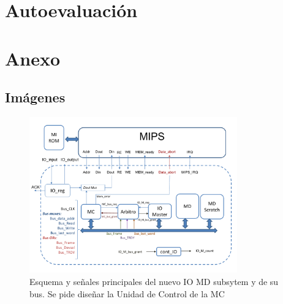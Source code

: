 \documentclass{article}
\begin{document}
\section{Autoevaluación}
\lipsum[15-18]

\newpage
\section{Anexo}
\subsection{Imágenes}
\begin{figure}[htbp]
  \centering
  \includegraphics[page=1, width=0.8\textwidth, clip]{assets/AOC2_2024_Esquemas_Proy2.pdf}
  \caption{Esquema y señales principales del nuevo IO MD subsytem y de su bus. Se pide diseñar la
Unidad de Control de la MC}
  \label{fig:imagen}
\end{figure}

\newpage

\end{document}
